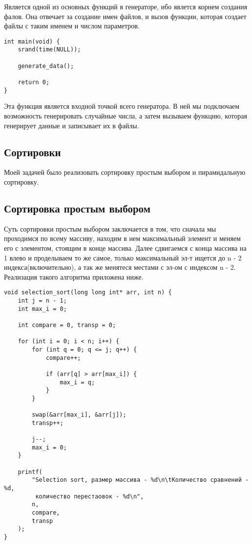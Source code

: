 \documentclass[a4paper,12pt,titlepage,finall]{article}
\begin{document}
Является одной из основных функций в генераторе, ибо явлется корнем создания фалов.
Она отвечает за создание имен файлов, и вызов функции, которая создает файлы с таким именем и числом параметров.

\begin{verbatim}
int main(void) {
    srand(time(NULL));

    generate_data();

    return 0;
}
\end{verbatim}

Эта функция является входной точкой всего генератора.
В ней мы подключаем возможность генерировать случайные числа,
а затем вызываем функцию, которая генерирует данные и записывает их в файлы.

\newpage

\subsection{Сортировки}

Моей задачей было реализовать сортировку простым выбором и пирамидальную сортировку.

\subsection{Сортировка простым выбором}

Суть сортировки простым выбором заключается в том, что сначала мы проходимся по всему массиву, находим
в нем максимальный элемент и меняем его с элементом, стоящим в конце массива. Далее сдвигаемся с конца массива на 1 влево
и проделываем то же самое, только максимальный эл-т ищется до n - 2 индекса(включительно),
а так же менятеся местами с эл-ом с индексом n - 2. Реализация такого алгоритма приложена ниже.

\begin{verbatim}
void selection_sort(long long int* arr, int n) {
    int j = n - 1;
    int max_i = 0;

    int compare = 0, transp = 0;

    for (int i = 0; i < n; i++) {
        for (int q = 0; q <= j; q++) {
            compare++;

            if (arr[q] > arr[max_i]) {
                max_i = q;  
            }
        }

        swap(&arr[max_i], &arr[j]);
        transp++;

        j--;
        max_i = 0;
    }

    printf(
        "Selection sort, размер массива - %d\n\tКоличество сравнений - %d,
         количество перестаовок - %d\n",
        n,
        compare,
        transp
    );
}
\end{verbatim}
\end{document}
